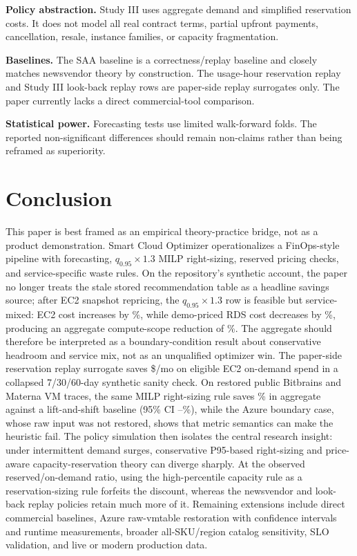 \documentclass[conference]{IEEEtran}
\begin{document}
\textbf{Policy abstraction.} Study III uses aggregate demand and simplified
reservation costs. It does not model all real contract terms, partial upfront
payments, cancellation, resale, instance families, or capacity fragmentation.

\textbf{Baselines.} The SAA baseline is a correctness/replay baseline and
closely matches newsvendor theory by construction. The usage-hour reservation
replay and Study III look-back replay rows are paper-side replay surrogates
only. The paper currently lacks a direct commercial-tool comparison.

\textbf{Statistical power.} Forecasting tests use limited walk-forward folds.
The reported non-significant differences should remain non-claims rather than
being reframed as superiority.

\section{Conclusion}

This paper is best framed as an empirical theory-practice bridge, not as a
product demonstration. Smart Cloud Optimizer operationalizes a FinOps-style
pipeline with forecasting, $q_{0.95}\times1.3$ MILP right-sizing, reserved
pricing checks, and service-specific waste rules. On the repository's
synthetic account, the paper no longer treats the stale stored recommendation
table as a headline savings source; after EC2 snapshot repricing, the
$q_{0.95}\times1.3$ row is feasible but service-mixed: EC2 cost increases by
\evidEcTwoDeltaPct\%, while demo-priced RDS cost decreases by
\evidRdsSavingsPct\%, producing an aggregate compute-scope reduction of
\evidPfiveSavingsPct\%. The aggregate should therefore be interpreted as a
boundary-condition result about conservative headroom and service mix, not as
an unqualified optimizer win. The paper-side reservation replay
surrogate saves \$\evidCommercialSavings{}/mo on eligible EC2 on-demand
spend in a collapsed 7/30/60-day synthetic sanity check. On restored public
Bitbrains and Materna VM traces, the same MILP right-sizing rule saves
\extOverallSavingsPct\% in aggregate against a lift-and-shift baseline
(95\% CI \extOverallSavingsCiLow--\extOverallSavingsCiHigh\%), while the
Azure boundary case, whose raw input was not restored, shows that metric
semantics can make the heuristic fail. The policy simulation then isolates the
central research
insight: under intermittent demand surges, conservative P95-based
right-sizing and price-aware capacity-reservation theory can diverge sharply.
At the observed reserved/on-demand ratio, using the high-percentile capacity
rule as a reservation-sizing rule forfeits the discount, whereas the
newsvendor and look-back replay policies retain much more of it. Remaining
extensions include direct commercial baselines, Azure raw-vmtable restoration
with confidence intervals and runtime measurements, broader all-SKU/region
catalog sensitivity, SLO validation, and live or modern production data.
\end{document}

